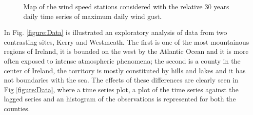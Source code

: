 \documentclass[preprint,12pt]{elsarticle}
\begin{document}
\begin{figure}[!h]
\captionsetup[subfigure]{labelformat=empty}
 \quad
\caption{Map of the wind speed stations considered with the relative 30 years daily time series of maximum daily wind gust.}
\label{figure:Ireland}
\end{figure}


In Fig. \ref{figure:Data} is illustrated an exploratory analysis of data from two contrasting sites, Kerry and Westmeath. The first is one of the  most mountainous regions of Ireland, it is bounded on the west by the Atlantic Ocean and it is more often exposed to intense atmospheric phenomena; the second is a county in the center of Ireland, the torritory is mostly constituted by hills and lakes and it has not boundaries with the sea.
The effects of these differences are clearly seen in Fig \ref{figure:Data}, where a time series plot, a plot of the time series against the lagged series and an histogram of the observations is represented for both the counties.
\end{document}
